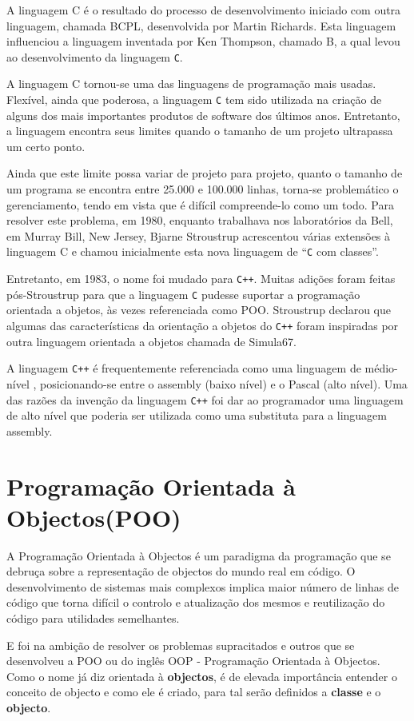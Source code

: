 \documentclass[a4paper,12pt]{article}
\begin{document}
A linguagem C é o resultado do processo de desenvolvimento iniciado com outra linguagem, chamada 
BCPL, desenvolvida por Martin Richards. Esta linguagem influenciou a linguagem 
inventada por Ken Thompson, chamado B, a qual levou ao desenvolvimento da 
linguagem \texttt{C}. 

A linguagem C tornou-se uma das linguagens de programação mais 
usadas. Flexível, ainda que poderosa, a linguagem \texttt{C} tem sido utilizada na criação 
de alguns dos mais importantes produtos de software dos últimos anos. Entretanto, a 
linguagem encontra seus limites quando o tamanho de um projeto ultrapassa um 
certo ponto.

Ainda que este limite possa variar de projeto para projeto, quanto o 
tamanho de um programa se encontra entre 25.000 e 100.000 linhas, torna-se 
problemático o gerenciamento, tendo em vista que é difícil compreende-lo como um 
todo. Para resolver este problema, em 1980, enquanto trabalhava nos laboratórios 
da Bell, em Murray Bill, New Jersey, Bjarne Stroustrup acrescentou várias extensões 
à linguagem C e chamou inicialmente esta nova linguagem de “\texttt{C} com classes”.

Entretanto, em 1983, o nome foi mudado para \texttt{C++}. 
Muitas adições foram feitas pós-Stroustrup para que a linguagem \texttt{C}
pudesse suportar a programação orientada a objetos, às vezes referenciada como 
POO. Stroustrup declarou que algumas das características da orientação a objetos 
do \texttt{C++} foram inspiradas por outra linguagem orientada a objetos chamada de 
Simula67. 

A linguagem \texttt{C++} é frequentemente referenciada como uma linguagem de 
médio-nível , posicionando-se entre o assembly (baixo nível) e o Pascal (alto nível). 
Uma das razões da invenção da linguagem \texttt{C++} foi dar ao programador uma linguagem 
de alto nível que poderia ser utilizada como uma substituta para a linguagem 
assembly. 
\newpage
\section{Programação Orientada à Objectos(POO)}
A Programação Orientada à Objectos é um paradigma da programação que se debruça sobre a representação
de objectos do mundo real em código. O desenvolvimento de sistemas mais complexos implica maior número
de linhas de código que torna difícil o controlo e atualização dos mesmos e reutilização do código para 
utilidades semelhantes. 

E foi na ambição de resolver os problemas supracitados e outros que se desenvolveu a POO ou do inglês OOP -
 Programação Orientada à Objectos.
 Como o nome já diz orientada à \textbf{objectos}, é de elevada importância entender o conceito de objecto e como ele é criado, para 
 tal serão definidos a \textbf{classe} e o \textbf{objecto}.
\end{document}
